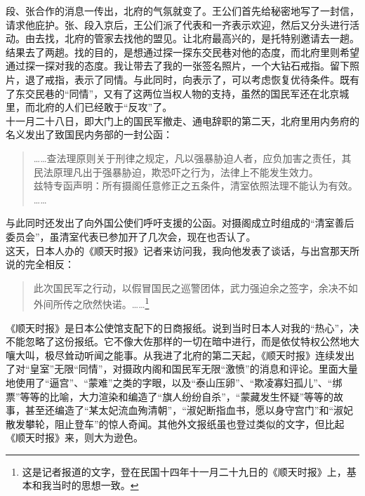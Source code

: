 段、张合作的消息一传出，北府的气氛就变了。王公们首先给秘密地写了一封信，请求他庇护。张、段入京后，王公们派了代表和一齐表示欢迎，然后又分头进行活动。由去找，北府的管家去找他的盟见。让北府最高兴的，是托特别邀请去一趟。结果去了两趟。找的目的，是想通过探一探东交民巷对他的态度，而北府里则希望通过探一探对我的态度。我让带去了我的一张签名照片，一个大钻石戒指。留下照片，退了戒指，表示了同情。与此同时，向表示了，可以考虑恢复优待条件。既有了东交民巷的“同情”，又有了这两位当权人物的支持，虽然的国民军还在北京城里，而北府的人们已经敢于“反攻”了。\\

十一月二十八日，即大门上的国民军撤走、通电辞职的第二天，北府里用内务府的名义发出了致国民内务部的一封公函：\\

\begin{quote}
	……查法理原则关于刑律之规定，凡以强暴胁迫人者，应负加害之责任，其民法原理凡出于强暴胁迫，欺恐吓之行为，法律上不能发生效力。\\

兹特专函声明：所有摄阁任意修正之五条件，清室依照法理不能认为有效。\\

……\\
\end{quote}

与此同时还发出了向外国公使们呼吁支援的公函。对摄阁成立时组成的“清室善后委员会”，虽清室代表已参加开了几次会，现在也否认了。\\

这天，日本人办的《顺天时报》记者来访问我，我向他发表了谈话，与出宫那天所说的完全相反：\\

\begin{quote}
	此次国民军之行动，以假冒国民之巡警团体，武力强迫余之签字，余决不如外间所传之欣然快诺。……\footnote{这是记者报道的文字，登在民国十四年十一月二十九日的《顺天时报》上，基本和我当时的思想一致。}\\
\end{quote}

《顺天时报》是日本公使馆支配下的日商报纸。说到当时日本人对我的“热心”，决不能忽略了这份报纸。它不像大佐那样的一切在暗中进行，而是依仗特权公然地大嚷大叫，极尽耸动听闻之能事。从我进了北府的第二天起，《顺天时报》连续发出了对“皇室”无限“同情”，对摄政内阁和国民军无限“激愤”的消息和评论。里面大量地使用了“逼宫”、“蒙难”之类的字眼，以及“泰山压卵”、“欺凌寡妇孤儿”、“绑票”等等的比喻，大力渲染和编造了“旗人纷纷自杀”，“蒙藏发生怀疑”等等的故事，甚至还编造了“某太妃流血殉清朝”，“淑妃断指血书，愿以身守宫门”和“淑妃散发攀轮，阻止登车”的惊人奇闻。其他外文报纸虽也登过类似的文字，但比起《顺天时报》来，则大为逊色。
